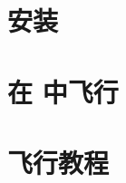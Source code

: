 \usepackage{makeidx}
\makeindex
\makeglossary

\usepackage[
    a4paper,
    bookmarks,
    bookmarksopen=true,
    bookmarksnumbered=true,
    colorlinks,
    linkcolor=blue,
    urlcolor=blue
]{hyperref}
\hypersetup{unicode}





\ifchinese
\part{安装}
\fi


\ifchinese
\part{在 \FlightGear{} 中飞行}
\fi




\ifchinese
\part{飞行教程}
\fi





\ifchinese
